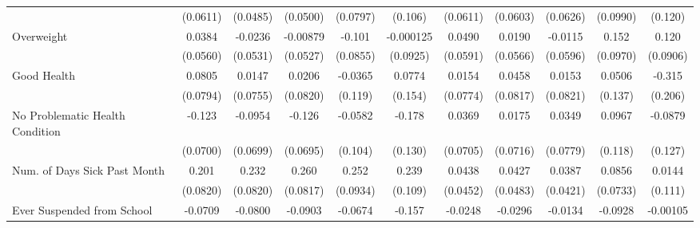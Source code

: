 {\begin{tabular}{l*{10}{c}}
            &    (0.0611)         &    (0.0485)         &    (0.0500)         &    (0.0797)         &     (0.106)         &    (0.0611)         &    (0.0603)         &    (0.0626)         &    (0.0990)         &     (0.120)         \\
\addlinespace
Overweight  &      0.0384         &     -0.0236         &    -0.00879         &      -0.101         &   -0.000125         &      0.0490         &      0.0190         &     -0.0115         &       0.152         &       0.120         \\
            &    (0.0560)         &    (0.0531)         &    (0.0527)         &    (0.0855)         &    (0.0925)         &    (0.0591)         &    (0.0566)         &    (0.0596)         &    (0.0970)         &    (0.0906)         \\
\addlinespace
Good Health &      0.0805         &      0.0147         &      0.0206         &     -0.0365         &      0.0774         &      0.0154         &      0.0458         &      0.0153         &      0.0506         &      -0.315         \\
            &    (0.0794)         &    (0.0755)         &    (0.0820)         &     (0.119)         &     (0.154)         &    (0.0774)         &    (0.0817)         &    (0.0821)         &     (0.137)         &     (0.206)         \\
\addlinespace
No Problematic Health Condition&      -0.123         &     -0.0954         &      -0.126         &     -0.0582         &      -0.178         &      0.0369         &      0.0175         &      0.0349         &      0.0967         &     -0.0879         \\
            &    (0.0700)         &    (0.0699)         &    (0.0695)         &     (0.104)         &     (0.130)         &    (0.0705)         &    (0.0716)         &    (0.0779)         &     (0.118)         &     (0.127)         \\
\addlinespace
Num. of Days Sick Past Month&       0.201\sym{*}  &       0.232\sym{**} &       0.260\sym{**} &       0.252\sym{**} &       0.239\sym{*}  &      0.0438         &      0.0427         &      0.0387         &      0.0856         &      0.0144         \\
            &    (0.0820)         &    (0.0820)         &    (0.0817)         &    (0.0934)         &     (0.109)         &    (0.0452)         &    (0.0483)         &    (0.0421)         &    (0.0733)         &     (0.111)         \\
\addlinespace
Ever Suspended from School&     -0.0709\sym{*}  &     -0.0800\sym{*}  &     -0.0903\sym{*}  &     -0.0674         &      -0.157\sym{*}  &     -0.0248         &     -0.0296         &     -0.0134         &     -0.0928         &    -0.00105         \\

\end{tabular}}
